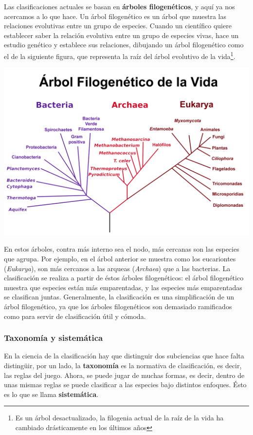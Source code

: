 Las clasificaciones actuales se basan en \textbf{árboles
  filogenéticos}, y aquí ya nos acercamos a lo que \fpt hace. Un árbol
filogenético es un árbol que muestra las relaciones evolutivas entre
un grupo de especies. Cuando un científico quiere establecer saber la
relación evolutiva entre un grupo de especies vivas, hace un estudio
genético y establece sus relaciones, dibujando un árbol filogenético
como el de la siguiente figura, que representa la raíz del árbol
evolutivo de la vida\footnote{Es un árbol desactualizado, la filogenia
  actual de la raíz de la vida ha cambiado drásticamente en los
  últimos años}.

\begin{center}
\includegraphics[scale=.2]{images/Phylogenetic_tree-es.png}
\end{center}

En estos árboles, contra más interno sea el nodo, más cercanas son las
especies que agrupa. Por ejemplo, en el árbol anterior se muestra como
los eucariontes (\textit{Eukarya}), son más cercanos a las arqueas
(\textit{Archaea}) que a las bacterias. La clasificación se realiza a
partir de éstos árboles filogenéticos: el árbol filogenético muestra
que especies están más emparentadas, y las especies más emparentadas
se clasifican juntas. Generalmente, la clasificación es una
simplificación de un árbol filogenético, ya que los árboles
filogenéticos son demasiado ramificados como para servir de
clasificación útil y cómoda.

\subsubsection{Taxonomía y sistemática}
En la ciencia de la clasificación hay que distinguir dos subciencias
que hace falta distingüir, por un lado, la \textbf{taxonomía} es la normativa
de clasificación, es decir, las reglas del juego. Ahora, se puede
jugar de muchas formas, es decir, dentro de unas mismas reglas se
puede clasificar a las especies bajo distintos enfoques. Ésto es lo
que se llama \textbf{sistemática}.

